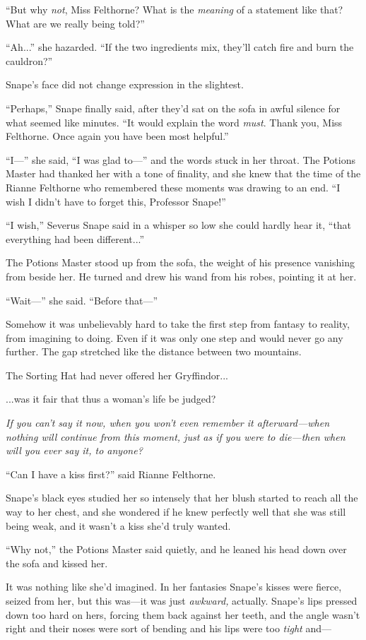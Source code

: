 “But why\emph{ not}, Miss Felthorne? What is the \emph{meaning} of a statement like that? What are we really being told?”

“Ah...” she hazarded. “If the two ingredients mix, they’ll catch fire and burn the cauldron?”

Snape’s face did not change expression in the slightest.

“Perhaps,” Snape finally said, after they’d sat on the sofa in awful silence for what seemed like minutes. “It would explain the word \emph{must}. Thank you, Miss Felthorne. Once again you have been most helpful.”

“I—” she said, “I was glad to—” and the words stuck in her throat. The Potions Master had thanked her with a tone of finality, and she knew that the time of the Rianne Felthorne who remembered these moments was drawing to an end. “I wish I didn’t have to forget this, Professor Snape!”

“I wish,” Severus Snape said in a whisper so low she could hardly hear it, “that everything had been different...”

The Potions Master stood up from the sofa, the weight of his presence vanishing from beside her. He turned and drew his wand from his robes, pointing it at her.

“Wait—” she said. “Before that—”

Somehow it was unbelievably hard to take the first step from fantasy to reality, from imagining to doing. Even if it was only one step and would never go any further. The gap stretched like the distance between two mountains.

The Sorting Hat had never offered her Gryffindor...

...was it fair that thus a woman’s life be judged?

\emph{If you can’t} \emph{say it now, when you won’t even remember it afterward—when nothing will continue from this moment, just as if you were to die—then when will you ever say it, to anyone?}

“Can I have a kiss first?” said Rianne Felthorne.

Snape’s black eyes studied her so intensely that her blush started to reach all the way to her chest, and she wondered if he knew perfectly well that she was still being weak, and it wasn’t a kiss she’d truly wanted.

“Why not,” the Potions Master said quietly, and he leaned his head down over the sofa and kissed her.

It was nothing like she’d imagined. In her fantasies Snape’s kisses were fierce, seized from her, but this was—it was just \emph{awkward,} actually. Snape’s lips pressed down too hard on hers, forcing them back against her teeth, and the angle wasn’t right and their noses were sort of bending and his lips were too \emph{tight} and—

